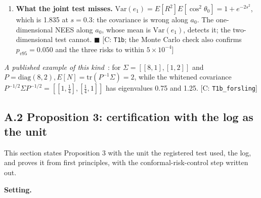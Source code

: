 \documentclass{ieeeaccess}
\begin{document}
\begin{enumerate}
\begin{equation*}
\mathrm{risk}(0) = \tfrac{1}{2}\cdot E\bigl[\exp\bigl(-z^2/(2\cos^2\theta_0)\bigr)\bigr].
\end{equation*}

One-dimensional quadrature at $z = z_{0.99}$ gives 0.02682, 0.01808 and 0.01214 for $s = 0.3$, 0.6 and 1.0. As $s \to 0$ the risk tends to $\tfrac{1}{2}e^{-z^{2}/2} = 0.0334$, and as $s \to \infty$ it tends to 0.01.
\item[5.] \textbf{What the joint test misses.} $\mathrm{Var}(e_{1}) = E[R^{2}]E[\cos^{2}\theta_{0}] = 1 + e^{-2s^{2}}$, which is 1.835 at $s = 0.3$: the covariance is wrong along $a_{0}$. The one-dimensional NEES along $a_{0}$, whose mean is $\mathrm{Var}(e_{1})$, detects it; the two-dimensional test cannot. $\blacksquare$ [C: \texttt{T1b}; the Monte Carlo check also confirms $p_{v95} = 0.050$ and the three risks to within $5 \times 10^{-4}$]
\end{enumerate}

\emph{A published example of this kind}~\cite{Forsling2025}: for $\Sigma = [[8, 1], [1, 2]]$ and $P = \mathrm{diag}(8, 2), E[N] = \mathrm{tr}(P^{-1}\Sigma) = 2$, while the whitened covariance $P^{-1/2}\Sigma P^{-1/2} = [[1, \tfrac{1}{4}], [\tfrac{1}{4}, 1]]$ has eigenvalues 0.75 and 1.25. [C: \texttt{T1b\_forsling}]

\subsection*{A.2 Proposition 3: certification with the log as the unit}
This section states Proposition 3 with the unit the registered test used, the log, and proves it from first principles, with the conformal-risk-control step written out.

\textbf{Setting.}
\end{document}
